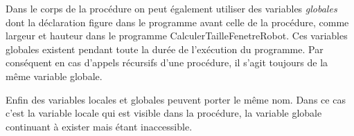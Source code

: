 {\begin{minipage}{\myparboxwidth}
Dans le corps de la procédure on peut également utiliser des variables
{\em glo\-ba\-les} dont la déclaration figure dans le programme
avant celle de la procédure, comme {\idt largeur} et {\idt hauteur} dans le programme
{\idt CalculerTailleFenetreRobot}. Ces variables globales existent
pendant toute la durée de l'exécution du programme. Par conséquent en cas
d'appels récursifs d'une procédure, il s'agit toujours de la
même variable globale.

Enfin des variables locales et globales peuvent porter le même nom. Dans
ce cas c'est la variable locale qui est visible dans la procédure, la variable
globale continuant à exister mais étant inaccessible.

\vspace{\abovedisplayskip}
\end{minipage}
}

